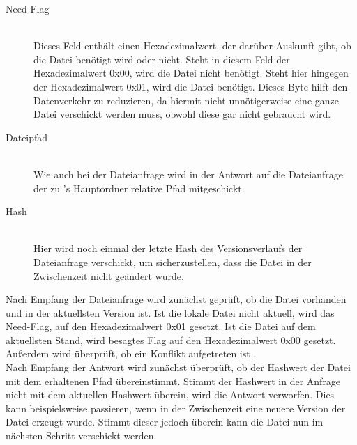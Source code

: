 \begin{description}
	\item[{Need-Flag}] \hfill \\
		Dieses Feld enthält einen Hexadezimalwert, der darüber Auskunft gibt, ob die Datei benötigt wird oder nicht. Steht in diesem Feld der Hexadezimalwert 0x00, wird die Datei nicht benötigt. Steht hier hingegen der Hexadezimalwert 0x01, wird die Datei benötigt. Dieses Byte hilft den Datenverkehr zu reduzieren, da hiermit nicht unnötigerweise eine ganze Datei verschickt werden muss, obwohl diese gar nicht gebraucht wird.
	\item[{Dateipfad}] \hfill \\
		Wie auch bei der Dateianfrage wird in der Antwort auf die Dateianfrage der zu \sblit's Hauptordner relative Pfad mitgeschickt.
	\item[{Hash}] \hfill \\
		Hier wird noch einmal der letzte Hash des Versionsverlaufs der Dateianfrage verschickt, um sicherzustellen, dass die Datei in der Zwischenzeit nicht geändert wurde. 
\end{description}
Nach Empfang der Dateianfrage wird zunächst geprüft, ob die Datei vorhanden und in der aktuellsten Version ist.  Ist die lokale Datei nicht aktuell, wird das Need-Flag, auf den Hexadezimalwert 0x01 gesetzt. Ist die Datei auf dem aktuellsten Stand, wird besagtes Flag auf den Hexadezimalwert 0x00 gesetzt. Außerdem wird überprüft, ob ein Konflikt aufgetreten ist .\\
Nach Empfang der Antwort wird zunächst überprüft, ob der Hashwert der Datei mit dem erhaltenen Pfad übereinstimmt. Stimmt der Hashwert in der Anfrage nicht mit dem aktuellen Hashwert überein, wird die Antwort verworfen. Dies kann beispielsweise passieren, wenn in der Zwischenzeit eine neuere Version der Datei erzeugt wurde. Stimmt dieser jedoch überein kann die Datei nun im nächsten Schritt verschickt werden.
		
